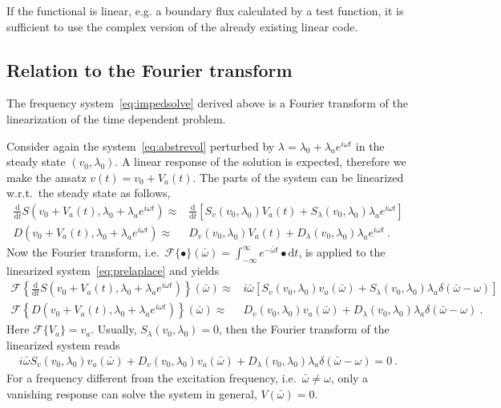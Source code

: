 \documentclass[12pt]{amsproc}
\newcommand{\Exp}[1]{e^{#1}}
\begin{document}
If the functional is linear, e.g. a boundary flux calculated by a test function, it is sufficient to
use the complex version of the already existing linear code.
 
\subsection{Relation to the Fourier transform}
The frequency system~\eqref{eq:impedsolve} derived above is a Fourier transform of the linearization of the time dependent problem.

Consider again the system~\eqref{eq:abstrevol} perturbed by $\lambda = \lambda_0 + \lambda_a \Exp{i\omega t}$ in the steady state $(v_0,\lambda_0)$.
A linear response of the solution is expected, therefore we make the ansatz $v(t) = v_0 + V_a(t)$.
The parts of the system can be linearized w.r.t.\ the steady state as follows,
\begin{subequations}
\begin{align}
    \frac{\mathrm{d}}{\mathrm{d}t}S(v_0+V_a(t),\lambda_0+\lambda_a\Exp{i\omega  t})
    \approx&
    \frac{\mathrm{d}}{\mathrm{d}t}\left[S_v(v_0,\lambda_0)V_a(t)+
    S_\lambda(v_0,\lambda_0)\lambda_a\Exp{i\omega  t}\right]\\
    D(v_0+V_a(t),\lambda_0+\lambda_a\Exp{i\omega  t})\approx& 
    D_v(v_0,\lambda_0)V_a(t)+
    D_\lambda(v_0,\lambda_0)\lambda_a\Exp{i\omega  t}~.
\end{align}
\label{eq:prelaplace}
\end{subequations}
Now the Fourier transform, i.e.\ $\mathcal{F}\{\bullet\}(\bar\omega) = \int_{-\infty}^\infty \Exp{-\bar\omega t} \bullet \mathrm{d}t$, is applied to the linearized system~\eqref{eq:prelaplace} and yields
\begin{subequations}
\begin{align}
    \mathcal{F}\left\{
        \frac{\mathrm{d}}{\mathrm{d}t}   S(v_0+V_a(t),\lambda_0+\lambda_a\Exp{i\omega  t}) 
    \right\}(\bar\omega)
    \approx&
    i\bar\omega\left[
     S_v(v_0,\lambda_0)v_a(\bar\omega)
     +S_\lambda(v_0,\lambda_0)\lambda_a\delta(\bar\omega-\omega)
    \right]\\
    \mathcal{F}\left\{
      D(v_0+V_a(t),\lambda_0+\lambda_a\Exp{i\omega  t})
    \right\}(\bar\omega)
    \approx&
    D_v(v_0,\lambda_0)v_a(\bar\omega)+
    D_\lambda(v_0,\lambda_0)\lambda_a\delta(\bar\omega-\omega)~.
\end{align}
\label{eq:fourier_linear}
\end{subequations}
Here $\mathcal{F} \{V_a\} = v_a$.
Usually,  $S_\lambda(v_0,\lambda_0)=0$, then the Fourier transform of the linearized system reads
\begin{align}
    i\bar\omega S_v(v_0,\lambda_0)v_a(\bar\omega)+
    D_v(v_0,\lambda_0)v_a(\bar\omega)+
    D_\lambda(v_0,\lambda_0)\lambda_a\delta(\bar\omega-\omega)=0~.
\end{align}
For a frequency different from the excitation frequency, i.e.\ $\bar\omega\neq\omega$, only a vanishing response can solve the system in general, $V(\bar\omega)=0$.
\end{document}
